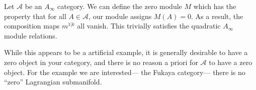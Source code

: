 
Let $\mathcal A$ be an $A_\infty$ category. We can define the zero module $M$ which has the property that for all $A\in \mathcal A$, our module assigns $M(A)=0$. As a result, the composition maps $m^{1|k}$ all vanish. This trivially satisfies the quadratic $A_\infty$ module relations.

While this appears to be a artificial example, it is generally desirable to have a zero object in your category, and there is no reason a priori for $\mathcal A$ to have a zero object. For the example we are interested--- the Fukaya category--- there is no ``zero'' Lagrangian submanifold.